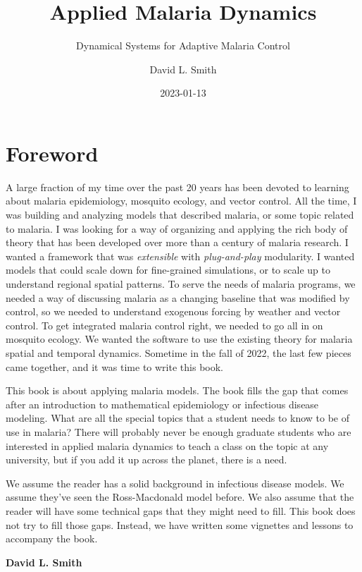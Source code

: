 \documentclass[
]{book}
\title{Applied Malaria Dynamics}
\subtitle{Dynamical Systems for Adaptive Malaria Control}
\author{David L. Smith}
\date{2023-01-13}
\begin{document}
\maketitle

{
\setcounter{tocdepth}{2}
\tableofcontents
}
\hypertarget{foreword}{%
\chapter*{Foreword}\label{foreword}}

A large fraction of my time over the past 20 years has been devoted to learning about malaria epidemiology, mosquito ecology, and vector control. All the time, I was building and analyzing models that described malaria, or some topic related to malaria. I was looking for a way of organizing and applying the rich body of theory that has been developed over more than a century of malaria research. I wanted a framework that was \emph{extensible} with \emph{plug-and-play} modularity. I wanted models that could scale down for fine-grained simulations, or to scale up to understand regional spatial patterns. To serve the needs of malaria programs, we needed a way of discussing malaria as a changing baseline that was modified by control, so we needed to understand exogenous forcing by weather and vector control. To get integrated malaria control right, we needed to go all in on mosquito ecology. We wanted the software to use the existing theory for malaria spatial and temporal dynamics. Sometime in the fall of 2022, the last few pieces came together, and it was time to write this book.

This book is about applying malaria models. The book fills the gap that comes after an introduction to mathematical epidemiology or infectious disease modeling. What are all the special topics that a student needs to know to be of use in malaria? There will probably never be enough graduate students who are interested in applied malaria dynamics to teach a class on the topic at any university, but if you add it up across the planet, there is a need.

We assume the reader has a solid background in infectious disease models. We assume they've seen the Ross-Macdonald model before. We also assume that the reader will have some technical gaps that they might need to fill. This book does not try to fill those gaps. Instead, we have written some vignettes and lessons to accompany the book.

\textbf{David L. Smith}
\end{document}
